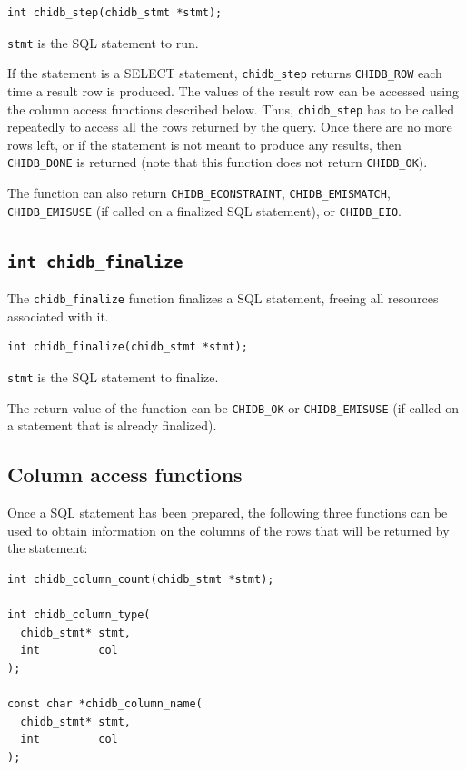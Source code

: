 \documentclass[10pt]{article}
\begin{document}
\begin{verbatim}
int chidb_step(chidb_stmt *stmt);
\end{verbatim}

\texttt{stmt} is the SQL statement to run.

If the statement is a SELECT statement, \verb+chidb_step+ returns \verb+CHIDB_ROW+ each time a result row is produced. The values of the result row can be accessed using the column access functions described below. Thus, \verb+chidb_step+ has to be called repeatedly to access all the rows returned by the query. Once there are no more rows left, or if the statement is not meant to produce any results, then \verb+CHIDB_DONE+ is returned (note that this function does not return \verb+CHIDB_OK+).

The function can also return \verb+CHIDB_ECONSTRAINT+, \verb+CHIDB_EMISMATCH+, \verb+CHIDB_EMISUSE+ (if called on a finalized SQL statement), or \verb+CHIDB_EIO+.

\subsection{\texttt{int chidb\_finalize}}

The \verb+chidb_finalize+ function finalizes a SQL statement, freeing all resources associated with it.

\begin{verbatim}
int chidb_finalize(chidb_stmt *stmt);
\end{verbatim}

\texttt{stmt} is the SQL statement to finalize.

The return value of the function can be \verb+CHIDB_OK+ or \verb+CHIDB_EMISUSE+ (if called on a statement that is already finalized).


\subsection{Column access functions}

Once a SQL statement has been prepared, the following three functions can be used to obtain information on the columns of the rows that will be returned by the statement:

\begin{verbatim}
int chidb_column_count(chidb_stmt *stmt);

int chidb_column_type(
  chidb_stmt* stmt, 
  int         col
);

const char *chidb_column_name(
  chidb_stmt* stmt, 
  int         col
);
\end{verbatim}
\end{document}
